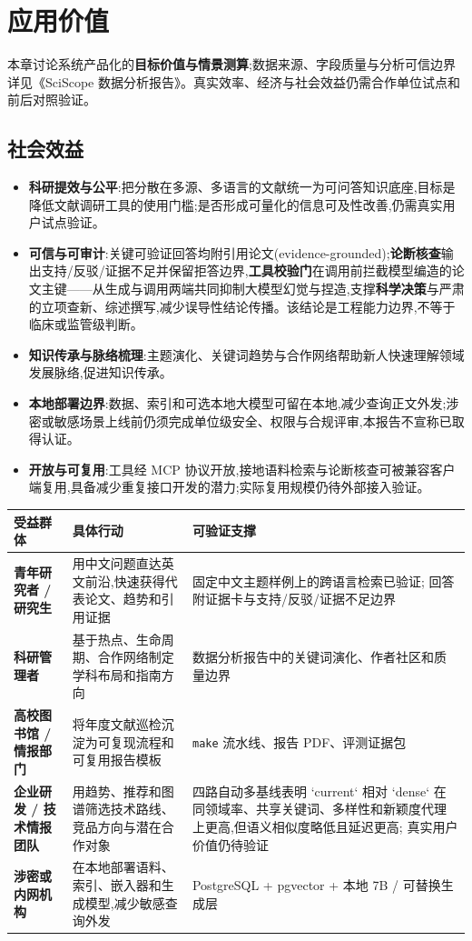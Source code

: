 \section{应用价值}

本章讨论系统产品化的\textbf{目标价值与情景测算};数据来源、字段质量与分析可信边界详见《SciScope 数据分析报告》。真实效率、经济与社会效益仍需合作单位试点和前后对照验证。

\subsection{社会效益}
\begin{itemize}
\item \textbf{科研提效与公平}:把分散在多源、多语言的文献统一为可问答知识底座,目标是降低文献调研工具的使用门槛;是否形成可量化的信息可及性改善,仍需真实用户试点验证。
\item \textbf{可信与可审计}:关键可验证回答均附引用论文(evidence-grounded);\textbf{论断核查}输出支持/反驳/证据不足并保留拒答边界,\textbf{工具校验门}在调用前拦截模型编造的论文主键——从生成与调用两端共同抑制大模型幻觉与捏造,支撑\textbf{科学决策}与严肃的立项查新、综述撰写,减少误导性结论传播。该结论是工程能力边界,不等于临床或监管级判断。
\item \textbf{知识传承与脉络梳理}:主题演化、关键词趋势与合作网络帮助新人快速理解领域发展脉络,促进知识传承。
\item \textbf{本地部署边界}:数据、索引和可选本地大模型可留在本地,减少查询正文外发;涉密或敏感场景上线前仍须完成单位级安全、权限与合规评审,本报告不宣称已取得认证。
\item \textbf{开放与可复用}:工具经 MCP 协议开放,接地语料检索与论断核查可被兼容客户端复用,具备减少重复接口开发的潜力;实际复用规模仍待外部接入验证。
\end{itemize}

\begin{tableblock}
\begin{tabularx}{0.96\textwidth}{>{\bfseries}p{28mm}X X}
\toprule
受益群体 & 具体行动 & 可验证支撑 \\
\midrule
青年研究者 / 研究生 & 用中文问题直达英文前沿,快速获得代表论文、趋势和引用证据 & 固定中文主题样例上的跨语言检索已验证; 回答附证据卡与支持/反驳/证据不足边界 \\
科研管理者 & 基于热点、生命周期、合作网络制定学科布局和指南方向 & 数据分析报告中的关键词演化、作者社区和质量边界 \\
高校图书馆 / 情报部门 & 将年度文献巡检沉淀为可复现流程和可复用报告模板 & \texttt{make} 流水线、报告 PDF、评测证据包 \\
企业研发 / 技术情报团队 & 用趋势、推荐和图谱筛选技术路线、竞品方向与潜在合作对象 & 四路自动多基线表明 `current` 相对 `dense` 在同领域率、共享关键词、多样性和新颖度代理上更高,但语义相似度略低且延迟更高; 真实用户价值仍待验证 \\
涉密或内网机构 & 在本地部署语料、索引、嵌入器和生成模型,减少敏感查询外发 & PostgreSQL + pgvector + 本地 7B / 可替换生成层 \\
\bottomrule
\end{tabularx}
\end{tableblock}


